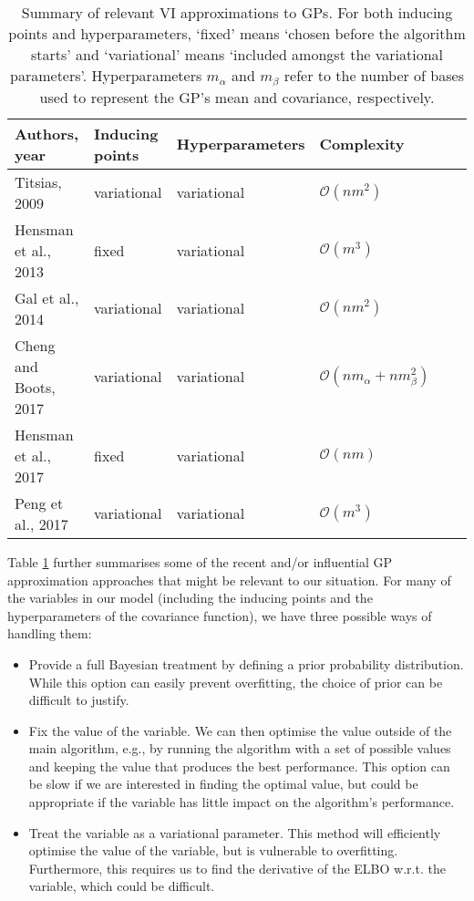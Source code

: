 \documentclass{mprop}
\theoremstyle{definition}
\begin{document}
\begin{table}
  \centering
  \begin{tabular}{llllll}
    \toprule
    Authors, year & Inducing points & Hyperparameters & Complexity \\
    \midrule
    Titsias, 2009 \cite{DBLP:journals/jmlr/Titsias09} & variational & variational & $\mathcal{O}(nm^2)$ \\
    Hensman et al., 2013 \cite{DBLP:conf/uai/HensmanFL13} & fixed & variational & $\mathcal{O}(m^3)$ \\
    Gal et al., 2014 \cite{DBLP:conf/nips/GalWR14} & variational & variational & $\mathcal{O}(nm^2)$ \\
    Cheng and Boots, 2017 \cite{DBLP:conf/nips/ChengB17} & variational & variational & $\mathcal{O}(nm_\alpha + nm_\beta^2)$ \\
    Hensman et al., 2017 \cite{DBLP:journals/jmlr/HensmanDS17} & fixed & variational & $\mathcal{O}(nm)$ \\
    Peng et al., 2017 \cite{DBLP:conf/icml/PengZZQ17} & variational & variational & $\mathcal{O}(m^3)$ \\
    \bottomrule
  \end{tabular}
  \caption{Summary of relevant VI approximations to GPs. For both inducing
    points and hyperparameters, `fixed' means `chosen before the algorithm
    starts' and `variational' means `included amongst the variational
    parameters'. Hyperparameters $m_\alpha$ and $m_\beta$ refer to the number of
    bases used to represent the GP's mean and covariance, respectively.}
  \label{table:approximations}
\end{table}

Table \ref{table:approximations} further summarises some of the recent and/or
influential GP approximation approaches that might be relevant to our situation.
For many of the variables in our model (including the inducing points and the
hyperparameters of the covariance function), we have three possible ways of
handling them:
\begin{itemize}
\item Provide a full Bayesian treatment by defining a prior probability
  distribution. While this option can easily prevent overfitting, the choice of
  prior can be difficult to justify.
\item Fix the value of the variable. We can then optimise the value outside of
  the main algorithm, e.g., by running the algorithm with a set of possible
  values and keeping the value that produces the best performance. This option
  can be slow if we are interested in finding the optimal value, but could be
  appropriate if the variable has little impact on the algorithm's performance.
\item Treat the variable as a variational parameter. This method will
  efficiently optimise the value of the variable, but is vulnerable to
  overfitting. Furthermore, this requires us to find the derivative of the ELBO
  w.r.t. the variable, which could be difficult.
\end{itemize}
\end{document}
